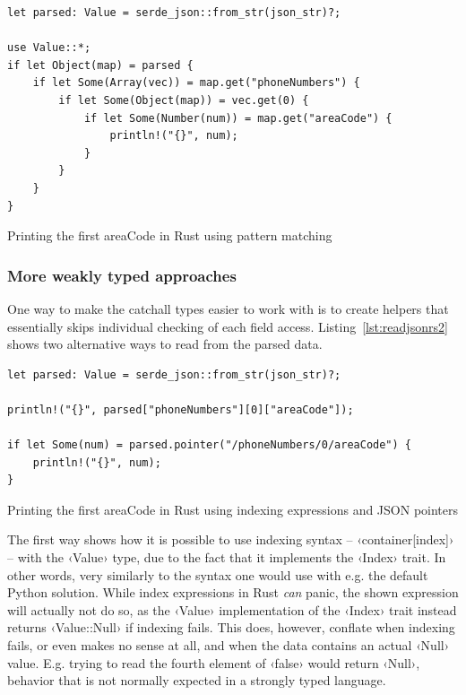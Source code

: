 \begin{listing}[ht!]
\begin{verbatim}
let parsed: Value = serde_json::from_str(json_str)?;

use Value::*;
if let Object(map) = parsed {
    if let Some(Array(vec)) = map.get("phoneNumbers") {
        if let Some(Object(map)) = vec.get(0) {
            if let Some(Number(num)) = map.get("areaCode") {
                println!("{}", num);
            }
        }
    }
}
\end{verbatim}
\caption{Printing the first areaCode in Rust using pattern matching}
\label{lst:readjsonrs1}
\end{listing}


\subsubsection{More weakly typed approaches}

One way to make the catchall types easier to work with is to create helpers that essentially skips individual checking of each field access. Listing~\ref{lst:readjsonrs2} shows two alternative ways to read from the parsed data.

\begin{listing}[ht!]
\begin{verbatim}
let parsed: Value = serde_json::from_str(json_str)?;

println!("{}", parsed["phoneNumbers"][0]["areaCode"]);

if let Some(num) = parsed.pointer("/phoneNumbers/0/areaCode") {
    println!("{}", num);
}
\end{verbatim}
\caption{Printing the first areaCode in Rust using indexing expressions and JSON pointers}
\label{lst:readjsonrs2}
\end{listing}

The first way shows how it is possible to use indexing syntax -- ‹container[index]› -- with the ‹Value› type, due to the fact that it implements the ‹Index› trait. In other words, very similarly to the syntax one would use with e.g. the default Python solution. While index expressions in Rust \emph{can} panic, the shown expression will actually not do so, as the ‹Value› implementation of the ‹Index› trait instead returns ‹Value::Null› if indexing fails. This does, however, conflate when indexing fails, or even makes no sense at all, and when the data contains an actual ‹Null› value. E.g. trying to read the fourth element of ‹false› would return ‹Null›, behavior that is not normally expected in a strongly typed language.

